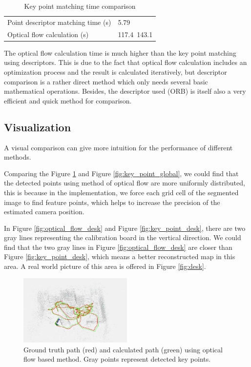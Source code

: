 \documentclass[conference]{IEEEtran}
\begin{document}
\begin{table}
	\centering
	\caption{Key point matching time comparison}
	\label{tab:matching}
	\begin{tabular}{ll}
		Point descriptor matching time (s) &5.79\\
		Optical flow calculation (s) & 117.4~143.1   \\              
	\end{tabular}
\end{table}

The optical flow calculation time is much higher than the key point matching using descriptors. This is due to the fact that optical flow calculation includes an optimization process and the result is calculated iteratively, but descriptor comparison is a rather direct method which only needs several basic mathematical operations. Besides, the descriptor used (ORB) is itself also a very efficient and quick method for comparison.


\subsection{Visualization}
A visual comparison can give more intuition for the performance of different methods. 

Comparing the Figure \ref{fig:optical_flow_global} and Figure \ref{fig:key_point_global}, we could find that the detected points using method of optical flow are more uniformly distributed, this is because in the implementation, we force each grid cell of the segmented image to find feature points, which helps to increase the precision of the estimated camera position.

In Figure \ref{fig:optical_flow_desk} and Figure \ref{fig:key_point_desk}, there are two gray lines representing the calibration board in the vertical direction. We could find that the two gray lines in Figure \ref{fig:optical_flow_desk} are closer than Figure \ref{fig:key_point_desk}, which means a better reconstructed map in this area. A real world picture of this area is offered in Figure 
\ref{fig:desk}.

\begin{figure}
	\label{fig:optical_flow_global}
	\centering
	\includegraphics[width=0.5\textwidth]{img/optical_flow_global.png}
	\caption{Ground truth path (red) and calculated path (green) using optical flow based method. Gray points represent detected key points.}
\end{figure}
\end{document}
